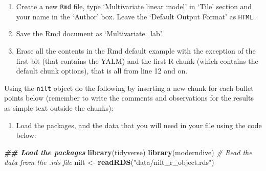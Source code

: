 \documentclass[
]{book}
\newenvironment{Shaded}{\begin{snugshade}}{\end{snugshade}}
\newcommand{\CommentTok}[1]{\textcolor[rgb]{0.56,0.35,0.01}{\textit{#1}}}
\newcommand{\DocumentationTok}[1]{\textcolor[rgb]{0.56,0.35,0.01}{\textbf{\textit{#1}}}}
\newcommand{\FunctionTok}[1]{\textcolor[rgb]{0.13,0.29,0.53}{\textbf{#1}}}
\newcommand{\NormalTok}[1]{#1}
\newcommand{\OtherTok}[1]{\textcolor[rgb]{0.56,0.35,0.01}{#1}}
\newcommand{\StringTok}[1]{\textcolor[rgb]{0.31,0.60,0.02}{#1}}
\providecommand{\tightlist}{%
  \setlength{\itemsep}{0pt}\setlength{\parskip}{0pt}}
\begin{document}
\begin{enumerate}
\def\labelenumi{\arabic{enumi}.}
\tightlist
\item
  Create a new \texttt{Rmd} file, type `Multivariate linear model' in `Tile' section and your name in the `Author' box. Leave the `Default Output Format' as \texttt{HTML}.
\item
  Save the Rmd document as `Multivariate\_lab'.
\item
  Erase all the contents in the Rmd default example with the exception of the first bit (that contains the YALM) and the first R chunk (which contains the default chunk options), that is all from line 12 and on.
\end{enumerate}

Using the \texttt{nilt} object do the following by inserting a new chunk for each bullet points below (remember to write the comments and observations for the results as simple text outside the chunks):

\begin{enumerate}
\def\labelenumi{\arabic{enumi}.}
\tightlist
\item
  Load the packages, and the data that you will need in your file using the code below:
\end{enumerate}

\begin{Shaded}
\begin{Highlighting}[]
\DocumentationTok{\#\# Load the packages}
\FunctionTok{library}\NormalTok{(tidyverse)}
\FunctionTok{library}\NormalTok{(moderndive)}
\CommentTok{\# Read the data from the .rds file}
\NormalTok{nilt }\OtherTok{\textless{}{-}} \FunctionTok{readRDS}\NormalTok{(}\StringTok{"data/nilt\_r\_object.rds"}\NormalTok{)}
\end{Highlighting}
\end{Shaded}
\end{document}
